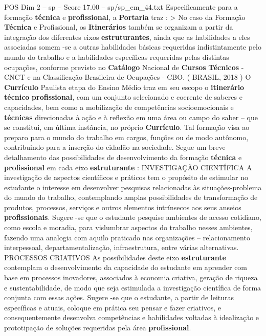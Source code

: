 \begin{textsample}{POS Dim 2 – sp – Score 17.00 – sp/sp\_em\_44.txt}
Especificamente para a formação \textbf{técnica} e \textbf{profissional}, a \textbf{Portaria} traz : > No caso da Formação \textbf{Técnica} e Profissional, os \textbf{Itinerários} também se organizam a partir da integração dos diferentes eixos \textbf{estruturantes}, ainda que as habilidades a eles associadas somem -se a outras habilidades básicas requeridas indistintamente pelo mundo do trabalho e a habilidades específicas requeridas pelas distintas ocupações, conforme previsto no \textbf{Catálogo} Nacional de \textbf{Cursos} \textbf{Técnicos} - CNCT e na Classificação Brasileira de Ocupações - CBO. ( BRASIL, 2018 ) O \textbf{Currículo} Paulista etapa do Ensino Médio traz em seu escopo o \textbf{itinerário} \textbf{técnico} \textbf{profissional}, com um conjunto selecionado e coerente de saberes e capacidades, bem como a mobilização de competências socioemocionais e \textbf{técnicas} direcionadas à ação e à reflexão em uma área ou campo do saber – que se constitui, em última instância, no próprio \textbf{Currículo}.
Tal formação visa ao preparo para o mundo do trabalho em cargos, funções ou de modo autônomo, contribuindo para a inserção do cidadão na sociedade.
Segue um breve detalhamento das possibilidades de desenvolvimento da formação \textbf{técnica} e \textbf{profissional} em cada eixo \textbf{estruturante} : INVESTIGAÇÃO CIENTÍFICA A investigação de aspectos científicos e práticos tem o propósito de estimular no estudante o interesse em desenvolver pesquisas relacionadas às situações-problema do mundo do trabalho, contemplando amplas possibilidades de transformação de produtos, processos, serviços e outros elementos intrínsecos aos seus anseios \textbf{profissionais}.
Sugere -se que o estudante pesquise ambientes de acesso cotidiano, como escola e moradia, para vislumbrar aspectos do trabalho nesses ambientes, fazendo uma analogia com aquilo praticado nas organizações – relacionamento interpessoal, departamentalização, infraestrutura, entre várias alternativas.
PROCESSOS CRIATIVOS As possibilidades deste eixo \textbf{estruturante} contemplam o desenvolvimento da capacidade do estudante em aprender com base em processos inovadores, associados à economia criativa, geração de riqueza e sustentabilidade, de modo que seja estimulada a investigação científica de forma conjunta com essas ações.
Sugere -se que o estudante, a partir de leituras específicas e atuais, coloque em prática seu pensar e fazer criativos, e consequentemente desenvolva competências e habilidades voltadas à idealização e prototipação de soluções requeridas pela área \textbf{profissional}.

\end{textsample}

